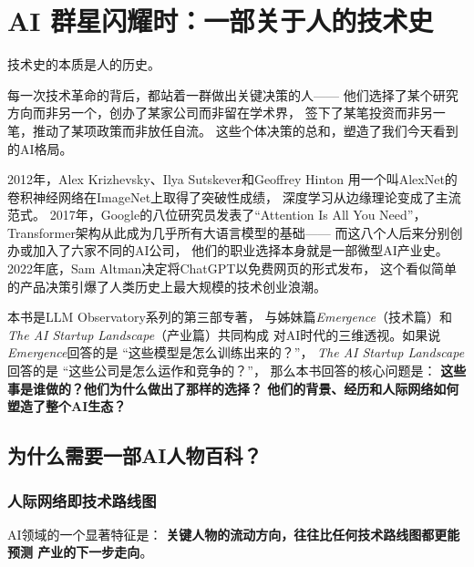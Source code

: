 
\chapter{AI 群星闪耀时：一部关于人的技术史}
\label{ch:overview}


技术史的本质是人的历史。

每一次技术革命的背后，都站着一群做出关键决策的人——
他们选择了某个研究方向而非另一个，创办了某家公司而非留在学术界，
签下了某笔投资而非另一笔，推动了某项政策而非放任自流。
这些个体决策的总和，塑造了我们今天看到的AI格局。

2012年，Alex Krizhevsky、Ilya Sutskever和Geoffrey Hinton
用一个叫AlexNet的卷积神经网络在ImageNet上取得了突破性成绩，
深度学习从边缘理论变成了主流范式。
2017年，Google的八位研究员发表了``Attention Is All You Need''，
Transformer架构从此成为几乎所有大语言模型的基础——
而这八个人后来分别创办或加入了六家不同的AI公司，
他们的职业选择本身就是一部微型AI产业史。
2022年底，Sam Altman决定将ChatGPT以免费网页的形式发布，
这个看似简单的产品决策引爆了人类历史上最大规模的技术创业浪潮。

本书是LLM Observatory系列的第三部专著，
与姊妹篇\textit{Emergence}（技术篇）和
\textit{The AI Startup Landscape}（产业篇）共同构成
对AI时代的三维透视。如果说\textit{Emergence}回答的是
``这些模型是怎么训练出来的？''，
\textit{The AI Startup Landscape}回答的是
``这些公司是怎么运作和竞争的？''，
那么本书回答的核心问题是：
\textbf{这些事是谁做的？他们为什么做出了那样的选择？
他们的背景、经历和人际网络如何塑造了整个AI生态？}


\section{为什么需要一部AI人物百科？}
\label{sec:overview-why}

\subsection{人际网络即技术路线图}

AI领域的一个显著特征是：
\textbf{关键人物的流动方向，往往比任何技术路线图都更能预测
产业的下一步走向}。

